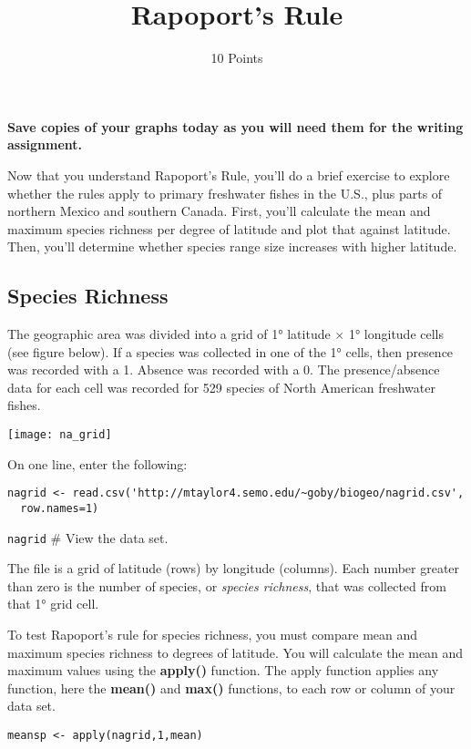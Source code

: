\documentclass[11pt]{article}
\title{Rapoport's Rule}
\author{10 Points}
\date{}                                           %
\begin{document}
\maketitle
\thispagestyle{plain}

\textbf{Save copies of your graphs today as you will need them for the
writing assignment.}

Now that you understand Rapoport's Rule, you'll do a brief exercise to explore whether the
rules apply to primary freshwater fishes in the U.S., plus parts of
northern Mexico and southern Canada. First, you'll calculate the mean
and maximum species richness per degree of latitude and plot that
against latitude. Then, you'll determine whether species range size
increases with higher latitude.

\subsection*{Species Richness}

The geographic area was divided into a grid of 1° latitude $\times$ 1°
longitude cells (see figure below). If a species was collected in one of
the 1° cells, then presence was recorded with a 1. Absence was recorded
with a 0. The presence/absence data for each cell was recorded for 529
species of North American freshwater fishes.

\begin{center}
	\texttt{[image: na\_grid]}
\end{center}

On one line, enter the following:

\begin{verbatim}
nagrid <- read.csv('http://mtaylor4.semo.edu/~goby/biogeo/nagrid.csv', 
  row.names=1)
\end{verbatim}
\texttt{nagrid} \qquad \# View the data set.

The file is a grid of latitude (rows) by longitude (columns). Each
number greater than zero is the number of species, or \emph{species
richness}, that was collected from that 1° grid cell.

To test Rapoport's rule for species richness, you must compare mean and
maximum species richness to degrees of latitude. You will calculate the
mean and maximum values using the \textbf{apply()} function. The apply
function applies any function, here the \textbf{mean()} and
\textbf{max()} functions, to each row or column of your data set.

\texttt{meansp \textless{}- apply(nagrid,1,mean)}
\end{document}
